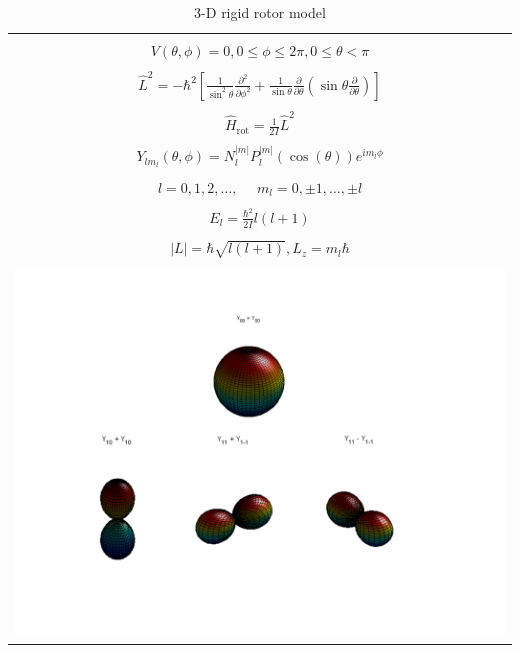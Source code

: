 \documentclass[11pt]{article}
\begin{document}
\begin{outline}
\begin{outline}
  \end{outline}
\begin{table}[tbh]
   \begin{center}
   \caption{3-D rigid rotor model}
    \label{3-D Rigid rotor}
\begin{tabular}[h]{|c|}
\hline
 \\
$\displaystyle       V(\theta,\phi) = 0, 0 \leq \phi \leq 2\pi, 0 \leq \theta <
\pi$ \\
 \\
$\displaystyle     \hat L^2 = -\hbar^2 \left [
  \frac{1}{\sin^2\theta}\frac{\partial^2}{\partial \phi^2}+\frac{1}{\sin
    \theta}\frac{\partial}{\partial \theta}\left ( \sin \theta
    \frac{\partial}{\partial \theta}\right ) \right ] $ \\
\\
$\displaystyle \hat H_\text{rot} = \frac{1}{2 I} \hat L^2$ \\
\\
$\displaystyle     Y_{lm_l}(\theta,\phi)=N_l^{|m|}P_l^{|m|}(\cos(\theta))e^{im_l\phi}$ \\
\\
$\displaystyle l = 0, 1, 2, \ldots, \ \ \ \ \ \ m_l = 0,\pm 1, \ldots, \pm l$
\\
\\
$\displaystyle     E_{l}=\frac{\hbar^2}{2 I}l(l+1)$ \\
 \\
$\displaystyle |L| = \hbar \sqrt{l(l+1)}, L_z = m_l \hbar $ \\
\\
     \includegraphics[scale=0.4]{Images/3D_rotor} \\       
\hline
\end{tabular}
 \end{center}
\end{table}


\end{outline}
\end{document}
